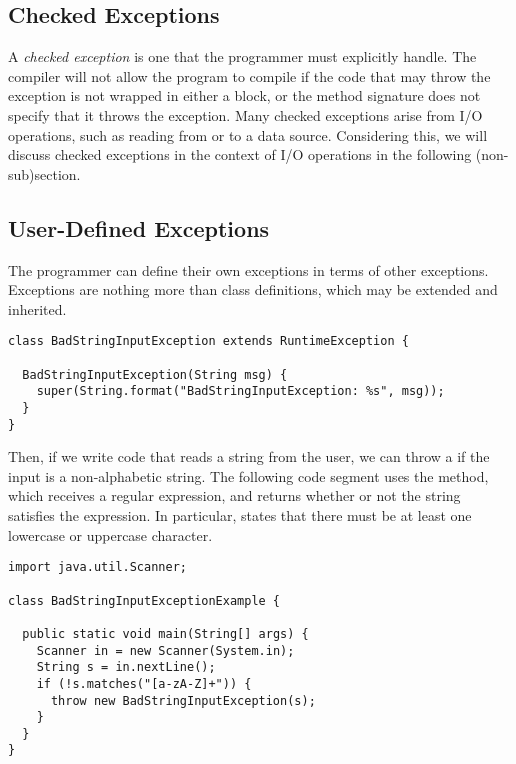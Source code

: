 \subsection{Checked Exceptions}

A \emph{checked exception} is one that the programmer must explicitly handle. The compiler will not allow the program to compile if the code that may throw the exception is not wrapped in either a  block, or the method signature does not specify that it throws the exception. Many checked exceptions arise from I/O operations, such as reading from or to a data source. Considering this, we will discuss checked exceptions in the context of I/O operations in the following (non-sub)section.

\subsection{User-Defined Exceptions}
The programmer can define their own exceptions in terms of other exceptions. Exceptions are nothing more than class definitions, which may be extended and inherited. 


\begin{lstlisting}[language=MyJava]
class BadStringInputException extends RuntimeException {
  
  BadStringInputException(String msg) {
    super(String.format("BadStringInputException: %s", msg));
  }
}
\end{lstlisting}

Then, if we write code that reads a string from the user, we can throw a  if the input is a non-alphabetic string. The following code segment uses the  method, which receives a regular expression, and returns whether or not the string satisfies the expression. In particular, \ttt{[a-zA-Z]+} states that there must be at least one lowercase or uppercase character.

\begin{lstlisting}[language=MyJava]
import java.util.Scanner;

class BadStringInputExceptionExample {
  
  public static void main(String[] args) {
    Scanner in = new Scanner(System.in);
    String s = in.nextLine();
    if (!s.matches("[a-zA-Z]+")) { 
      throw new BadStringInputException(s); 
    }
  }
}
\end{lstlisting}

